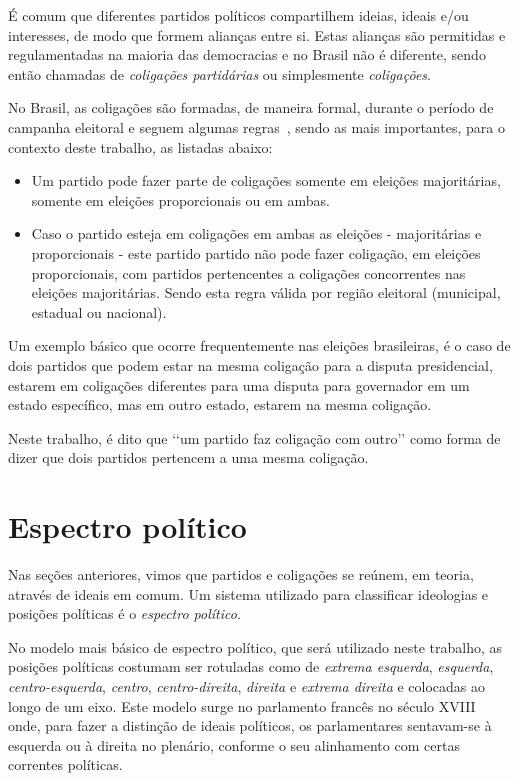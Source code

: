 É comum que diferentes partidos políticos compartilhem ideias, ideais e/ou interesses, de modo que formem alianças entre si. Estas alianças são permitidas e regulamentadas na maioria das democracias e no Brasil não é diferente, sendo então chamadas de \emph{coligações partidárias} ou simplesmente \emph{coligações}.

No Brasil, as coligações são formadas, de maneira formal, durante o período de campanha eleitoral e seguem algumas regras~\cite{brasil1997lei9504}, sendo as mais importantes, para o contexto deste trabalho, as listadas abaixo:

\begin{itemize}
    \item Um partido pode fazer parte de coligações somente em eleições majoritárias, somente em eleições proporcionais ou em ambas.
    \item Caso o partido esteja em coligações em ambas as eleições - majoritárias e proporcionais - este partido partido não pode fazer coligação, em eleições proporcionais, com partidos pertencentes a coligações concorrentes nas eleições majoritárias. Sendo esta regra válida por região eleitoral (municipal, estadual ou nacional).
\end{itemize}

Um exemplo básico que ocorre frequentemente nas eleições brasileiras, é o caso de dois partidos que podem estar na mesma coligação para a disputa presidencial, estarem em coligações diferentes para uma disputa para governador em um estado específico, mas em outro estado, estarem na mesma coligação.

Neste trabalho, é dito que ‘‘um partido faz coligação com outro’’ como forma de dizer que dois partidos pertencem a uma mesma coligação.

\section{Espectro político}
\label{conceitos__espectro-politico}

Nas seções anteriores, vimos que partidos e coligações se reúnem, em teoria, através de ideais em comum. Um sistema utilizado para classificar ideologias e posições políticas é o \emph{espectro político}.

No modelo mais básico de espectro político, que será utilizado neste trabalho, as posições políticas costumam ser rotuladas como de \emph{extrema esquerda}, \emph{esquerda}, \emph{centro-esquerda}, \emph{centro}, \emph{centro-direita}, \emph{direita} e \emph{extrema direita} e colocadas ao longo de um eixo. Este modelo surge no parlamento francês no século XVIII onde, para fazer a distinção de ideais políticos, os parlamentares sentavam-se à esquerda ou à direita no plenário, conforme o seu alinhamento com certas correntes políticas.

